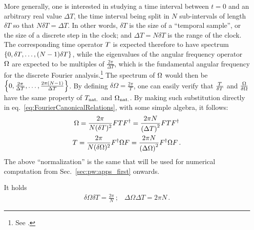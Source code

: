 More generally, one is interested in studying a time interval
between $t=0$ and an arbitrary real value $\Delta{T}$,
the time interval being split in $N$ sub-intervals of length $\delta{T}$
so that $N\delta{T} = \Delta{T}$.
In other words, $\delta T$
is the size of a ``temporal sample'', or the size of a discrete
step in the clock;
and $\Delta T = N\delta T$ is the range of the clock.
The corresponding time operator ${T}$
is expected therefore to have spectrum $\left\{0, \delta{T}, \dots, (N-1)\delta{T}\right\}$,
while the eigenvalues of the angular frequency operator ${\Omega}$
are expected to be multiples of
$\frac{2\pi}{\Delta{T}}$, which is
the fundamental
angular frequency for the discrete Fourier analysis.\footnote{
  See
  \cite[chapters
    ``The Discrete Fourier Transform'' and
    ``Fourier Analysis of Signals Using the Discrete Fourier Transform'']{Oppenheim:Int1,Oppenheim:Int3}.
}
The spectrum of ${\Omega}$ would then be $\left\{0, \frac{2\pi}{\Delta{T}}, \dots, \frac{2\pi(N-1)}{\Delta{T}}\right\}$.
By defining $\delta{\Omega} = \frac{2\pi}{T}$,
one can easily verify that $\frac{{T}}{\delta{T}}$ and $\frac{{\Omega}}{\delta{\Omega}}$
have the same property of ${T}_{\mathrm{nat.}}$ and ${\Omega}_{\mathrm{nat.}}$.  
By making such substitution directly in eq.~\eqref{eq:FourierCanonicalRelations},
with some simple algebra, it follows:
\begin{gather}
  \label{eq:SI_Fourier:Omega}
    {\Omega} = \frac{2\pi}{N(\delta T)^2} F {T} F^{\dagger} = \frac{2\pi N}{\qty(\Delta T)^2} F {T} F^{\dagger} \\
  \label{eq:SI_Fourier:T}
    {T} = \frac{2\pi}{N(\delta\Omega)^2} F^{\dagger} {\Omega} F = \frac{2\pi N}{\qty(\Delta\Omega)^2} F^{\dagger} {\Omega} F
  \, \text{.}
\end{gather}
The above ``normalization'' is the same that will be used
for numerical computation from Sec.~\ref{sec:pw:apps_first} onwards.

It holds
\begin{gather}
  \delta\Omega \delta T = \frac{2\pi}{N} \, \text{;} \quad
  \Delta\Omega \Delta T = 2\pi N \, \text{.}
\end{gather}

